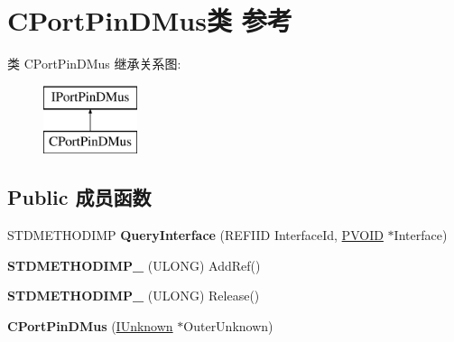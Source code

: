 \hypertarget{class_c_port_pin_d_mus}{}\section{C\+Port\+Pin\+D\+Mus类 参考}
\label{class_c_port_pin_d_mus}
类 C\+Port\+Pin\+D\+Mus 继承关系图\+:\begin{figure}[H]
\begin{center}
\leavevmode
\includegraphics[height=2.000000cm]{class_c_port_pin_d_mus}
\end{center}
\end{figure}
\subsection*{Public 成员函数}
\begin{DoxyCompactItemize}
\item 
\mbox{\label{class_c_port_pin_d_mus_a66ffe10cf21b7864c36e528b6b0ef847}} 
S\+T\+D\+M\+E\+T\+H\+O\+D\+I\+MP {\bfseries Query\+Interface} (R\+E\+F\+I\+ID Interface\+Id, \hyperlink{interfacevoid}{P\+V\+O\+ID} $\ast$Interface)
\item 
\mbox{\label{class_c_port_pin_d_mus_a7eb3ebf5ec9442ca7d341c108bfd5402}} 
{\bfseries S\+T\+D\+M\+E\+T\+H\+O\+D\+I\+M\+P\+\_\+} (U\+L\+O\+NG) Add\+Ref()
\item 
\mbox{\label{class_c_port_pin_d_mus_a11774ac2b138d8c2a3992d1f63e4ee0b}} 
{\bfseries S\+T\+D\+M\+E\+T\+H\+O\+D\+I\+M\+P\+\_\+} (U\+L\+O\+NG) Release()
\item 
\mbox{\label{class_c_port_pin_d_mus_ac01e85183c707fe91213e883aa6b3905}} 
{\bfseries C\+Port\+Pin\+D\+Mus} (\hyperlink{interface_i_unknown}{I\+Unknown} $\ast$Outer\+Unknown)
\end{DoxyCompactItemize}
